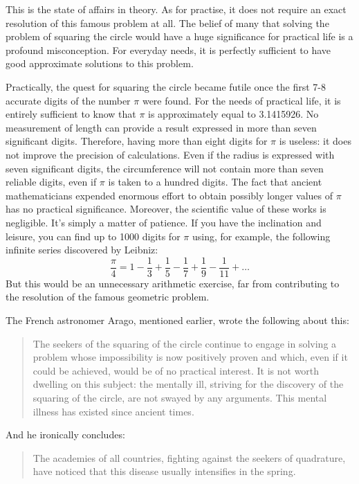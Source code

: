 This is the state of affairs in theory. As for practise, it does not require an exact resolution of this famous problem at all. The belief of many that solving the problem of squaring the circle would have a huge significance for practical life is a profound misconception. For everyday needs, it is perfectly sufficient to have good approximate solutions to this problem.


Practically, the quest for squaring the circle became futile once the first 7-8 accurate digits of the number $\pi$ were found. For the needs of practical life, it is entirely sufficient to know that $\pi$ is approximately equal to 3.1415926. No measurement of length can provide a result expressed in more than seven significant digits. Therefore, having more than eight digits for $\pi$ is useless: it does not improve the precision of calculations. Even if the radius is expressed with seven significant digits, the circumference will not contain more than seven reliable digits, even if $\pi$ is taken to a hundred digits. The fact that ancient mathematicians expended enormous effort to obtain possibly longer values of $\pi$ has no practical significance. Moreover, the scientific value of these works is negligible. It's simply a matter of patience. If you have the inclination and leisure, you can find up to 1000 digits for $\pi$ using, for example, the following infinite series discovered by Leibniz:
\begin{equation*}%
\frac{\pi}{4} = 1 - \frac{1}{3} + \frac{1}{5} - \frac{1}{7} + \frac{1}{9} - \frac{1}{11} + \ldots{}
\end{equation*}
But this would be an unnecessary arithmetic exercise, far from contributing to the resolution of the famous geometric problem.

The French astronomer Arago, mentioned earlier, wrote the following about this:
\begin{quote}
The seekers of the squaring of the circle continue to engage in solving a problem whose impossibility is now positively proven and which, even if it could be achieved, would be of no practical interest. It is not worth dwelling on this subject: the mentally ill, striving for the discovery of the squaring of the circle, are not swayed by any arguments. This mental illness has existed since ancient times.
\end{quote}
And he ironically concludes:
\begin{quote}
The academies of all countries, fighting against the seekers of quadrature, have noticed that this disease usually intensifies in the spring.
\end{quote}


